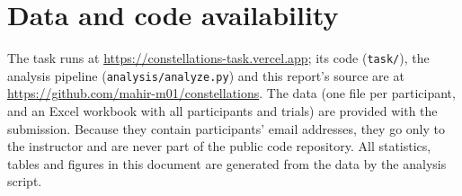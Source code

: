 \documentclass[11pt,a4paper]{article}
\begin{document}
\section*{Data and code availability}
The task runs at \url{https://constellations-task.vercel.app}; its code (\texttt{task/}), the analysis pipeline
(\texttt{analysis/analyze.py}) and this report's source are at \url{https://github.com/mahir-m01/constellations}. The data
(one file per participant, and an Excel workbook with all participants and trials) are provided with the submission. Because
they contain participants' email addresses, they go only to the instructor and are never part of the public code repository.
All statistics, tables and figures in this document are generated from the data by the analysis script.



\end{document}
